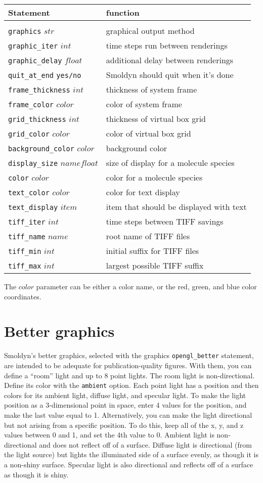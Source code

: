 \documentclass {scrbook}
\newcommand {\ttt} {\texttt}
\begin{document}
\begin{longtable}[c]{ll}
Statement & function\\
\hline\\
\ttt{graphics} $str$ & graphical output method\\
\ttt{graphic\_iter} $int$ & time steps run between renderings\\
\ttt{graphic\_delay} $float$ & additional delay between renderings\\
\ttt{quit\_at\_end} \ttt{yes/no} & Smoldyn should quit when it's done\\
\ttt{frame\_thickness} $int$ & thickness of system frame\\
\ttt{frame\_color} $color$ & color of system frame\\
\ttt{grid\_thickness} $int$ & thickness of virtual box grid\\
\ttt{grid\_color} $color$ & color of virtual box grid\\
\ttt{background\_color} $color$ & background color\\
\ttt{display\_size} $name float$ & size of display for a molecule species\\
\ttt{color} $color$ & color for a molecule species\\
\ttt{text\_color} $color$ & color for text display\\
\ttt{text\_display} $item$ & item that should be displayed with text\\
\ttt{tiff\_iter} $int$ & time steps between TIFF savings\\
\ttt{tiff\_name} $name$ & root name of TIFF files\\
\ttt{tiff\_min} $int$ & initial suffix for TIFF files\\
\ttt{tiff\_max} $int$ & largest possible TIFF suffix\\
\end{longtable}
The $color$ parameter can be either a color name, or the red, green, and blue color coordinates.

\section{Better graphics}

Smoldyn's better graphics, selected with the graphics \ttt{opengl\_better} statement, are intended to be adequate for publication-quality figures. With them, you can define a ``room'' light and up to 8 point lights. The room light is non-directional. Define its color with the \ttt{ambient} option. Each point light has a position and then colors for its ambient light, diffuse light, and specular light. To make the light position as a 3-dimensional point in space, enter 4 values for the position, and make the last value equal to 1. Alternatively, you can make the light directional but not arising from a specific position. To do this, keep all of the x, y, and z values between 0 and 1, and set the 4th value to 0. Ambient light is non-directional and does not reflect off of a surface. Diffuse light is directional (from the light source) but lights the illuminated side of a surface evenly, as though it is a non-shiny surface. Specular light is also directional and reflects off of a surface as though it is shiny.
\end{document}

